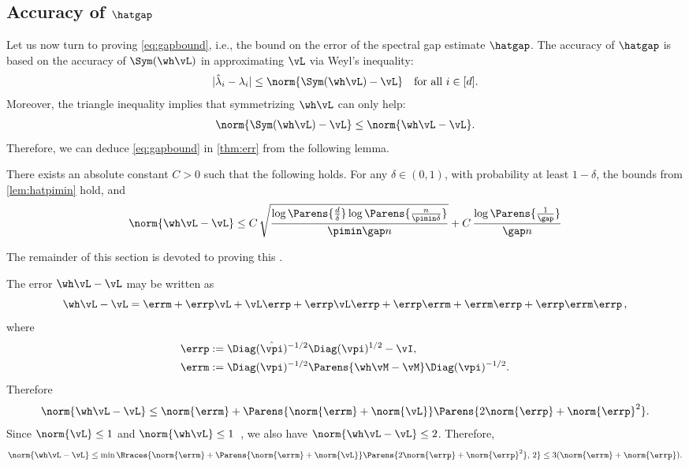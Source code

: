 
\subsection{Accuracy of $\hatgap$}

Let us now turn to proving \cref{eq:gapbound}, i.e., 
the bound on the error of the spectral gap estimate $\hatgap$.
The accuracy of $\hatgap$ is based on the accuracy of $\Sym(\wh\vL)$
in approximating $\vL$ via Weyl's inequality:
\begin{align*}
  |\hat\lambda_i - \lambda_i|
  \leq \norm{\Sym(\wh\vL) - \vL}
  \quad \text{for all }i \in [d] .
\end{align*}
Moreover, the triangle inequality implies that symmetrizing $\wh\vL$
can only help:
\begin{align*}
  \norm{\Sym(\wh\vL) - \vL} \leq \norm{\wh\vL - \vL} .
\end{align*}
Therefore, we can deduce \cref{eq:gapbound} in \cref{thm:err} from the
following lemma.
\begin{lemma}
  \label{lem:gap}
  There exists an absolute constant $C>0$ such that the following
  holds.
  For any $\delta \in (0,1)$, with probability at least $1-\delta$,
  the bounds from \cref{lem:hatpimin} hold, and
  \begin{equation*}
    \norm{\wh\vL - \vL}
    \leq
    C\,
      \sqrt{
        \frac{
          \log\Parens{\frac{d}{\delta}}
          \log\Parens{\frac{n}{\pimin\delta}}
        }{\pimin\gap n}
      }
      +
      C\,
      \frac{\log\Parens{\frac{1}{\gap}}}{\gap n}
  \end{equation*}
\end{lemma}
The remainder of this section is devoted to proving this
.

The error $\wh\vL - \vL$ may be written as
\[
  \wh\vL - \vL
  = \errm + \errp \vL + \vL \errp + \errp \vL \errp
  + \errp \errm + \errm \errp + \errp \errm \errp\,,
\]
where
\begin{align*}
  \errp & := \Diag(\hat\vpi)^{-1/2} \Diag(\vpi)^{1/2} - \vI , \\
  \errm & := \Diag(\vpi)^{-1/2} \Parens{
    \wh\vM - \vM
  } \Diag(\vpi)^{-1/2} .
\end{align*}
Therefore
\begin{align*}
  \norm{\wh\vL - \vL}
  \leq \norm{\errm} +
  \Parens{
    \norm{\errm} + \norm{\vL}
  }
  \Parens{
    2\norm{\errp} + \norm{\errp}^2
  }
  .
\end{align*}
Since $\norm{\vL} \leq 1$ and $\norm{\wh\vL} \leq 1$~\citep[Lemma
12.1]{LePeWi08}, we also have $\norm{\wh\vL - \vL} \leq 2$.
Therefore,
\begin{align}
  \norm{\wh\vL - \vL}
  \leq
  \min\Braces{
    \norm{\errm} +
    \Parens{
      \norm{\errm} + \norm{\vL}
    }
    \Parens{
      2\norm{\errp} + \norm{\errp}^2
    }
    ,\,
    2
  }
  \leq 3(\norm{\errm}+\norm{\errp})
  .
  \label{eq:vlsimple}
\end{align}


